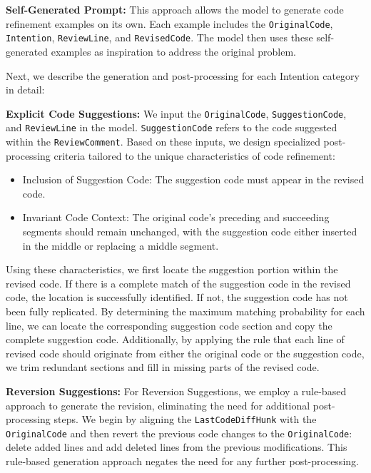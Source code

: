 \noindent \textbf{Self-Generated Prompt:} This approach allows the model to generate code refinement examples on its own. Each example includes the \texttt{OriginalCode}, \texttt{Intention}, \texttt{ReviewLine}, and \texttt{RevisedCode}. The model then uses these self-generated examples as inspiration to address the original problem.

Next, we describe the generation and post-processing for each Intention category in detail:

\noindent \textbf{Explicit Code Suggestions:} We input the \texttt{OriginalCode}, \texttt{SuggestionCode}, and \texttt{ReviewLine} in the model. \texttt{SuggestionCode} refers to the code suggested within the \texttt{ReviewComment}. Based on these inputs, we design specialized post-processing criteria tailored to the unique characteristics of code refinement:

\begin{itemize}[leftmargin=*,topsep=2pt]
    \item Inclusion of Suggestion Code: The suggestion code must appear in the revised code.
    \item Invariant Code Context: The original code’s preceding and succeeding segments should remain unchanged, with the suggestion code either inserted in the middle or replacing a middle segment.
\end{itemize}

Using these characteristics, we first locate the suggestion portion within the revised code. If there is a complete match of the suggestion code in the revised code, the location is successfully identified. If not, the suggestion code has not been fully replicated. By determining the maximum matching probability for each line, we can locate the corresponding suggestion code section and copy the complete suggestion code. Additionally, by applying the rule that each line of revised code should originate from either the original code or the suggestion code, we trim redundant sections and fill in missing parts of the revised code.

\noindent \textbf{Reversion Suggestions:} For Reversion Suggestions, we employ a rule-based approach to generate the revision, eliminating the need for additional post-processing steps.  We begin by aligning the \texttt{LastCodeDiffHunk} with the \texttt{OriginalCode} and then revert the previous code changes to the \texttt{OriginalCode}: delete added lines and add deleted lines from the previous modifications. This rule-based generation approach negates the need for any further post-processing.

